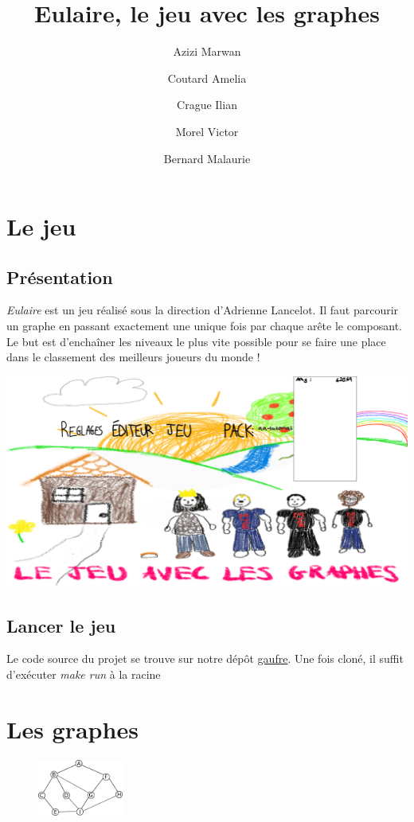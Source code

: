 \documentclass[12pt]{article}
\title{Eulaire, le jeu avec les graphes}
\author{Azizi Marwan \and Coutard Amelia \and Crague Ilian \and Morel Victor \and Bernard Malaurie}
\begin{document}
\maketitle

\section{Le jeu}

\subsection{Présentation}
\textit{Eulaire} est un jeu réalisé sous la direction d'Adrienne Lancelot. Il faut parcourir un graphe en passant exactement une unique fois par chaque arête le composant. Le but est d'enchaîner les niveaux le plus vite possible pour se faire une place dans le classement des meilleurs joueurs du monde  !

\vskip 2cm

\includegraphics[scale=0.2]{images/menu.png}


\subsection{Lancer le jeu}
Le code source du projet se trouve sur notre dépôt \href{https://gaufre.informatique.univ-paris-diderot.fr/eulaire/2022-al1-ga-eulaire}{gaufre}. Une fois cloné, il suffit d'exécuter \textit{make run} à la racine

\section{Les graphes}
\begin{figure}
    \includegraphics[width=0.25\textwidth]{images/graphe.png}
\end{figure}
\end{document}
